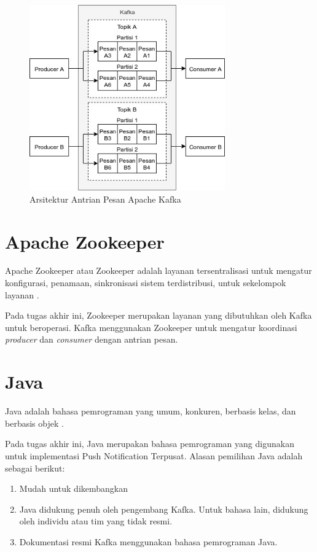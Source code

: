 \begin{figure}[H]
	\centering\includegraphics[width=0.75\textwidth]{bab2/img/arsitektur-mq_kafka.jpg}
	\caption{Arsitektur Antrian Pesan Apache Kafka}
	\label{img:arsitektur-mq_kafka}
\end{figure}

\section{Apache Zookeeper}
\par Apache Zookeeper atau Zookeeper adalah layanan tersentralisasi untuk mengatur konfigurasi, penamaan, sinkronisasi sistem terdistribusi, untuk sekelompok layanan \cite{zookeeper-online}.
\par Pada tugas akhir ini, Zookeeper merupakan layanan yang dibutuhkan oleh Kafka untuk beroperasi. Kafka menggunakan Zookeeper untuk mengatur koordinasi \textit{producer} dan \textit{consumer} dengan antrian pesan.

\section{Java}
\par Java adalah bahasa pemrograman yang umum, konkuren, berbasis kelas, dan berbasis objek \cite{java-online}.
\par Pada tugas akhir ini, Java merupakan bahasa pemrograman yang digunakan untuk implementasi Push Notification Terpusat. Alasan pemilihan Java adalah sebagai berikut:
\begin{enumerate}
	\item Mudah untuk dikembangkan
	\item Java didukung penuh oleh pengembang Kafka. Untuk bahasa lain, didukung oleh individu atau tim yang tidak resmi.
	\item Dokumentasi resmi Kafka menggunakan bahasa pemrograman Java.
\end{enumerate}

